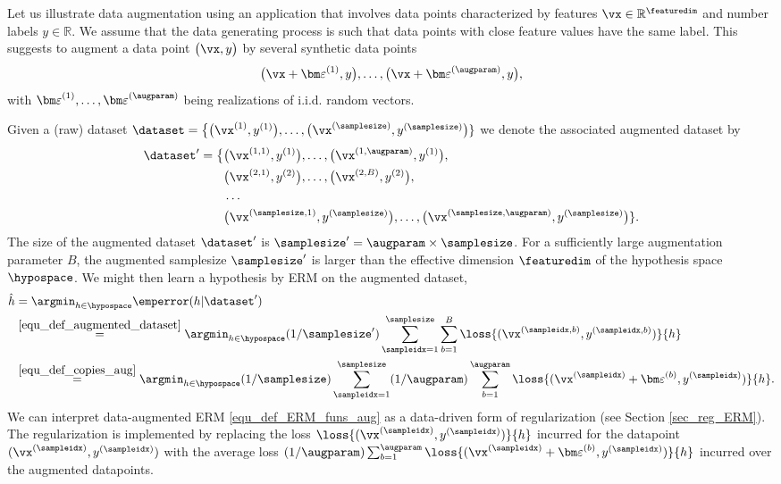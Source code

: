 \documentclass[12pt]{report}
\newcommand{\featurelen}{\featuredim}
\begin{document}
Let us illustrate data augmentation using an application that involves data points characterized 
by features $\vx \in \mathbb{R}^{\featuredim}$ and number labels $y \in \mathbb{R}$. We assume 
that the data generating process is such that data points with close feature values have the same label. 
This suggests to augment a data point $\big(\vx,y\big)$ by several synthetic data points 
\begin{equation} 
\label{equ_def_copies_aug}
\big(\vx+{\bm \varepsilon}^{(1)},y\big),\ldots,\big(\vx+{\bm \varepsilon}^{(\augparam)},y\big), 
\end{equation}
with ${\bm \varepsilon}^{(1)},\ldots,{\bm \varepsilon}^{(\augparam)}$ being realizations of i.i.d. random vectors. 

Given a (raw) dataset $\dataset = \big\{ \big(\vx^{(1)},y^{(1)}\big),\ldots, \big(\vx^{(\samplesize)},y^{(\samplesize)}\big) \} $ 
we denote the associated augmented dataset by 
\begin{align} 
\label{equ_def_augmented_dataset}
\dataset' = \big\{ &\big(\vx^{(1,1)},y^{(1)}\big), \ldots, \big(\vx^{(1,\augparam)},y^{(1)}\big), \nonumber \\ 
                                  &\big(\vx^{(2,1)},y^{(2)}\big), \ldots, \big(\vx^{(2,B)},y^{(2)}\big), \nonumber \\ 
                                  & \ldots \nonumber \\ 
 &\big(\vx^{(\samplesize,1)},y^{(\samplesize)}\big), \ldots, \big(\vx^{(\samplesize,\augparam)},y^{(\samplesize)}\big) \}. 
\end{align} 
The size of the augmented dataset $\dataset'$ is $ \samplesize' = \augparam \times \samplesize$. 
For a sufficiently large augmentation parameter $B$, the augmented samplesize $\samplesize'$ is 
larger than the effective dimension $\featurelen$ of the hypothesis space $\hypospace$. We might 
then learn a hypothesis by ERM on the augmented dataset, 
\begin{align}
\label{equ_def_ERM_funs_aug}
\hat{h} & = \argmin_{h \in \hypospace} \emperror(h|\dataset') \nonumber \\ 
& \stackrel{\eqref{equ_def_augmented_dataset}}{=}  \argmin_{h \in \hypospace} (1/\samplesize') \sum_{\sampleidx=1}^{\samplesize} \sum_{b=1}^{B} \loss{(\vx^{(\sampleidx,b)},y^{(\sampleidx,b)})}{h} \nonumber \\ 
& \stackrel{\eqref{equ_def_copies_aug}}{=}  \argmin_{h \in \hypospace} (1/\samplesize) \sum_{\sampleidx=1}^{\samplesize} (1/\augparam)\sum_{b=1}^{\augparam} \loss{(\vx^{(\sampleidx)}+{\bm \varepsilon}^{(b)},y^{(\sampleidx)})}{h}. 
\end{align}
We can interpret data-augmented ERM \eqref{equ_def_ERM_funs_aug} as a data-driven 
form of regularization (see Section \ref{sec_reg_ERM}). The regularization is implemented 
by replacing the loss $\loss{(\vx^{(\sampleidx)},y^{(\sampleidx)})}{h}$ incurred for the 
datapoint $(\vx^{(\sampleidx)},y^{(\sampleidx)})$ with the average 
loss $(1/\augparam)\sum_{b=1}^{\augparam} \loss{(\vx^{(\sampleidx)}+{\bm \varepsilon}^{(b)},y^{(\sampleidx)})}{h}$ 
incurred over the augmented datapoints. 
\end{document}
